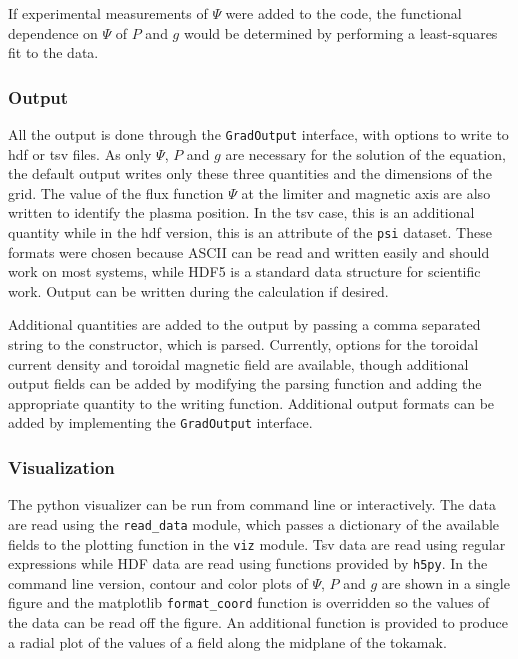 \documentclass[paper=letter, fontsize=11pt]{scrartcl} %
\begin{document}
If experimental measurements of $\Psi$ were added to the code, the functional dependence on $\Psi$ of $P$ and $g$ would be determined by performing a least-squares fit to the data. 

\subsubsection{Output}
All the output is done through the \texttt{GradOutput} interface, with options to write to hdf or tsv files. As only $\Psi$, $P$ and $g$ are necessary for the solution of the equation, the default output writes only these three quantities and the dimensions of the grid. The value of the flux function $\Psi$ at the limiter and magnetic axis are also written to identify the plasma position. In the tsv case, this is an additional quantity while in the hdf version, this is an attribute of the \texttt{psi} dataset. These formats were chosen because ASCII can be read and written easily and should work on most systems, while HDF5 is a standard data structure for scientific work. Output can be written during the calculation if desired.

Additional quantities are added to the output by passing a comma separated string to the constructor, which is parsed. Currently, options for the toroidal current density and toroidal magnetic field are available, though additional output fields can be added by modifying the parsing function and adding the appropriate quantity to the writing function. Additional output formats can be added by implementing the \texttt{GradOutput} interface.

\subsubsection{Visualization}

The python visualizer can be run from command line or interactively. The data are read using the \texttt{read\_data} module, which passes a dictionary of the available fields to the plotting function in the \texttt{viz} module. Tsv data are read using regular expressions while HDF data are read using functions provided by \texttt{h5py}. In the command line version, contour and color plots of $\Psi$, $P$ and $g$ are shown in a single figure and the matplotlib \texttt{format\_coord} function is overridden so the values of the data can be read off the figure. An additional function is provided to produce a radial plot of the values of a field along the midplane of the tokamak. 
\end{document}
